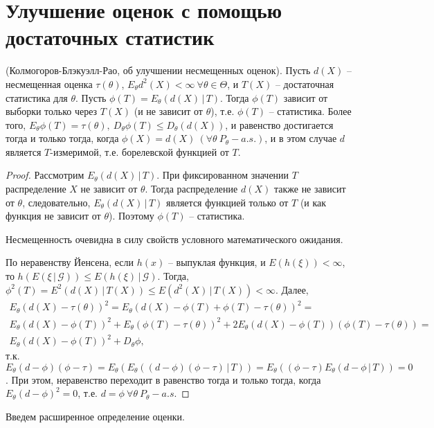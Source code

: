 \section{Улучшение оценок с помощью достаточных статистик}
\begin{theorem}
    (Колмогоров-Блэкуэлл-Рао, об улучшении несмещенных оценок). Пусть $d(X)$ -- несмещенная оценка $\tau(\theta)$, $E_\theta d^2(X) < \infty\ \forall \theta \in \Theta$, и $T(X)$ -- достаточная статистика для $\theta$. Пусть $\phi(T) = E_\theta(d(X)\, \vert\, T)$. Тогда $\phi(T)$ зависит от выборки только через $T(X)$ (и не зависит от $\theta$), т.е. $\phi(T)$ -- статистика. Более того, $E_\theta \phi(T) = \tau(\theta),\ D_\theta \phi(T) \leq D_\theta(d(X))$, и равенство достигается тогда и только тогда, когда $\phi(X) = d(X)\ (\forall \theta\ P_\theta-a.s.)$, и в этом случае $d$ является $T$-измеримой, т.е. борелевской функцией от $T$.
\end{theorem}
\begin{proof}
    Рассмотрим  $E_\theta(d(X)\, \vert\, T)$. При фиксированном значении $T$ распределение $X$ не зависит от $\theta$. Тогда распределение $d(X)$ также не зависит от $\theta$, следовательно, $E_\theta(d(X)\, \vert\, T)$ является функцией только от $T$ (и как функция не зависит от $\theta$). Поэтому $\phi(T)$ -- статистика.
    
    Несмещенность очевидна в силу свойств условного математического ожидания.
    
    По неравенству Йенсена, если $h(x)$ -- выпуклая функция, и $E(h(\xi))<\infty$, то $h(E(\xi\, \vert\, \mathcal{G})) \leq E(h(\xi)\, \vert\, \mathcal{G})$. Тогда, $\phi^2(T) = E^2(d(X)\, \vert\, T(X)) \leq E(d^2(X)\, \vert\, T(X)) < \infty$. Далее,
    \begin{gather*}
        E_\theta(d(X) - \tau(\theta))^2 = E_\theta(d(X) - \phi(T) + \phi(T) - \tau(\theta))^2 =\\
        E_\theta(d(X) - \phi(T))^2 + E_\theta(\phi(T) - \tau(\theta))^2 + 2E_\theta(d(X) - \phi(T))(\phi(T) - \tau(\theta)) =\\ E_\theta(d(X) - \phi(T))^2 + D_\theta\phi,
    \end{gather*}
    т.к. $E_\theta(d - \phi)(\phi - \tau) = E_\theta(E_\theta((d-\phi)(\phi - \tau)\, \vert\, T)) = E_\theta((\phi - \tau)E_\theta(d - \phi\, \vert\, T)) = 0$.
    При этом, неравенство переходит в равенство тогда и только тогда, когда $E_\theta(d-\phi)^2 = 0$, т.е. $d=\phi\ \forall \theta\ P_\theta-a.s.$
\end{proof}
Введем расширенное определение оценки.
